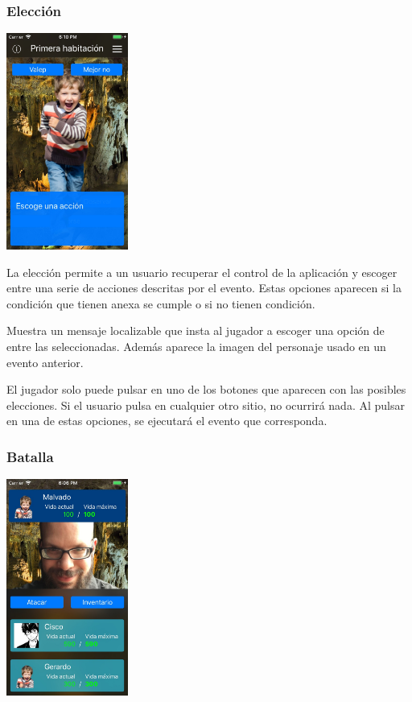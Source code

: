 \subsubsection{Elección}
\begin{center}
	\includegraphics[width=0.3\textwidth]{include/snapshots/chose.jpg}
\end{center}
La elección permite a un usuario recuperar el control de la aplicación y escoger entre una serie de acciones descritas por el evento. Estas opciones aparecen si la condición que tienen anexa se cumple o si no tienen condición.

Muestra un mensaje localizable que insta al jugador a escoger una opción de entre las seleccionadas. Además aparece la imagen del personaje usado en un evento anterior.

El jugador solo puede pulsar en uno de los botones que aparecen con las posibles elecciones. Si el usuario pulsa en cualquier otro sitio, no ocurrirá nada.
Al pulsar en una de estas opciones, se ejecutará el evento que corresponda.

\subsubsection{Batalla} \label{battleDesignSubsection}
\begin{center}
	\includegraphics[width=0.3\textwidth]{include/snapshots/battle.jpg}
\end{center}

